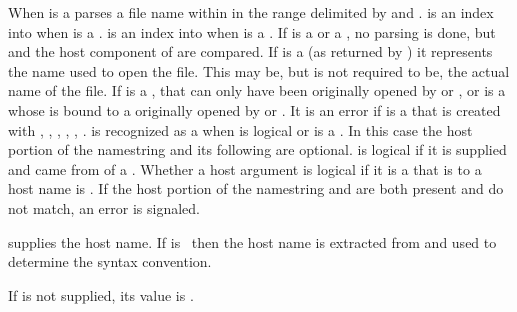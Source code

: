 When  is a  
parses a file name within  in the
range delimited by  and .
 is an index into  when  is
a . 
 is an index into  when  is
a . 
If  is a  or a ,
no parsing is done, but  and the host component of 
 are compared.
If  is a  (as returned by )
it represents the name used to open the file. This may be, but is
not required to be, the actual name of the file. 
If  is a , that 
can only have been originally opened by
 or , 
or is a  whose  is bound
to a  originally opened by
 or .
It is an error if  is a  that is 
created with , 
,
, 
, ,
.
 is recognized as a  
when  is logical or  is
a .   
In this case the host portion of the 
 namestring and its following  are optional.  
 is logical if it is supplied and came from
 of a 
.  Whether a host argument is logical
  if it is a  that is  to a 
 host name is
  .
If the host
  portion of the namestring and  are both present and do
  not match, an error is signaled.               
 
                                       

 supplies the host name.
If  is \nil\ then the host 
name is extracted from 
and used to determine the syntax convention.  

If  is not supplied,
its value is .

